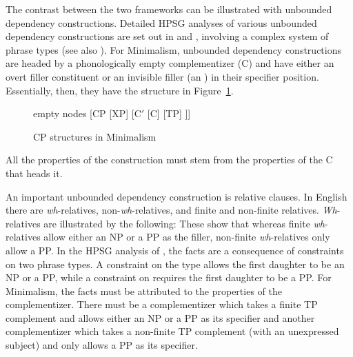 \documentclass[output=paper
	        ,collection
	        ,collectionchapter
 	        ,biblatex
                ,babelshorthands
                ,newtxmath
                ,draftmode
                ,colorlinks, citecolor=brown
]{langscibook}
\begin{document}
The contrast between the two frameworks can be illustrated with unbounded dependency
constructions. Detailed HPSG analyses of various unbounded dependency constructions are set out in
\citet{Sag97a,Sag2010b} and \citet{GSag2000a-u}, involving a complex system of phrase types (see
also ). For
Minimalism, unbounded dependency constructions are headed by a phonologically empty complementizer
(C) and have either an overt filler constituent or an invisible filler (an ) in their
specifier position. Essentially, then, they have the structure in Figure~\ref{fig:min-CP}.
\begin{figure}
	\centering
	\begin{forest} %
		empty nodes
		[CP
		[XP]
		[C$'$ [C] [TP]
		]]
	\end{forest}
	\caption{\label{fig:min-CP}CP structures in Minimalism}
\end{figure}
All the properties of the construction must stem from the properties of the C that heads it. 

An important unbounded dependency construction is relative clauses. In English there are \emph{wh}-relatives, non-\emph{wh}-relatives, and finite and non-finite relatives. \emph{Wh}-relatives are illustrated by the following:
\eal
{}\label{ex:min-someone-who-can}
\label{ex:min-someone-on-whom-can}
\zl 
\eal
{}\label{ex:min-someone-who-to}
\label{ex:min-someone-whom-to}
\zl 
These show that whereas finite \emph{wh}-relatives allow either an NP or a PP as the filler,
non-finite \emph{wh}-relatives only allow a PP. In the HPSG analysis of \citet{Sag97a}, the facts
are a consequence of constraints on two phrase types. A constraint on the type
 allows the first daughter to be an
NP or a PP, while a constraint on 
requires the first daughter to be a PP. For Minimalism, the facts must be attributed to the
properties of the complementizer. There must be a complementizer which takes a finite TP complement
and allows either an NP or a PP as its specifier and another complementizer which takes a non-finite
TP complement (with an unexpressed subject) and only allows a PP as its specifier. 
\end{document}
